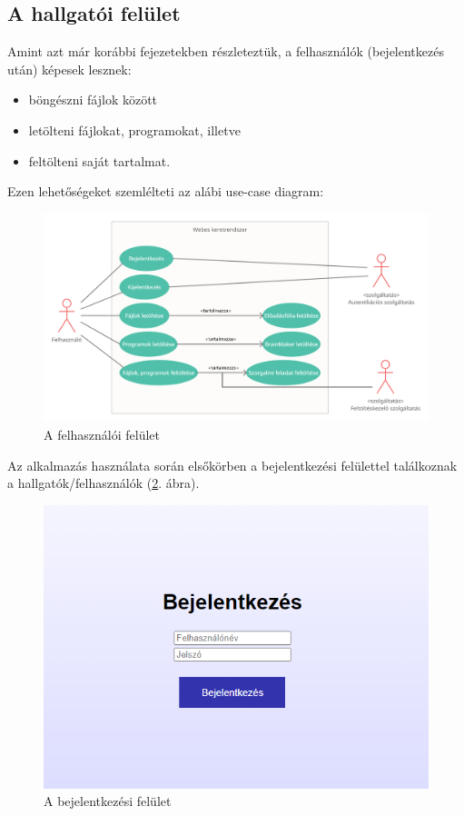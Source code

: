 \subsection{A hallgatói felület}

Amint azt már korábbi fejezetekben részleteztük, a felhasználók (bejelentkezés után) képesek lesznek:

\begin{itemize}
\item{böngészni fájlok között}
\item{letölteni fájlokat, programokat, illetve}
\item{feltölteni saját tartalmat.}
\end{itemize}

Ezen lehetőségeket szemlélteti az alábi use-case diagram:

\begin{figure}[h]
	\centering
		\includegraphics[width=10truecm, height=7truecm]{images/felhasznalo_use_case.png}
	\caption{A felhasználói felület}
	\label{fig:login}
\end{figure}

Az alkalmazás használata során elsőkörben a bejelentkezési felülettel találkoznak a hallgatók/felhasználók (\ref{fig:login}. ábra). 

\begin{figure}[h]
	\centering
		\includegraphics[width=10truecm, height=7truecm]{images/bejelentkezes.png}
	\caption{A bejelentkezési felület}
	\label{fig:login}
\end{figure}

